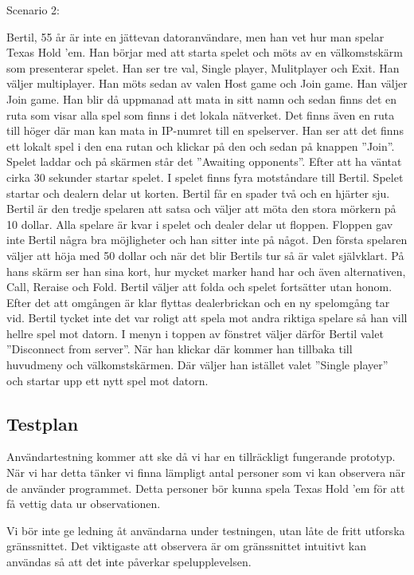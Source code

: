 \documentclass[10pt,twoside,a4paper]{article}
\begin{document}
\vspace{1em}
\noindent
Scenario 2:

\vspace{1em}
\noindent
Bertil, 55 år är inte en jättevan datoranvändare, men han vet hur man
spelar Texas Hold ’em. Han börjar med att starta spelet och möts av en
välkomstskärm som presenterar spelet. Han ser tre val, Single player,
Mulitplayer och Exit. Han väljer multiplayer. Han möts sedan av valen Host
game och Join game. Han väljer Join game. Han blir då uppmanad att mata in
sitt namn och sedan finns det en ruta som visar alla spel som finns i det
lokala nätverket. Det finns även en ruta till höger där man kan mata in
IP-numret till en spelserver. Han ser att det finns ett lokalt spel i den
ena rutan och klickar på den och sedan på knappen ”Join”. Spelet laddar och
på skärmen står det ”Awaiting opponents”. Efter att ha väntat cirka 30
sekunder startar spelet. I spelet finns fyra motståndare till Bertil.
Spelet startar och dealern delar ut korten. Bertil får en spader två och en
hjärter sju. Bertil är den tredje spelaren att satsa och väljer att möta
den stora mörkern på 10 dollar. Alla spelare är kvar i spelet och dealer
delar ut floppen. Floppen gav inte Bertil några bra möjligheter och han
sitter inte på något. Den första spelaren väljer att höja med 50 dollar och
när det blir Bertils tur så är valet självklart. På hans skärm ser han sina
kort, hur mycket marker hand har och även alternativen, Call, Reraise och
Fold. Bertil väljer att folda och spelet fortsätter utan honom. Efter det
att omgången är klar flyttas dealerbrickan och en ny spelomgång tar vid.
Bertil tycket inte det var roligt att spela mot andra riktiga spelare så
han vill hellre spel mot datorn. I menyn i toppen av fönstret väljer därför
Bertil valet ”Disconnect from server”. När han klickar där kommer han
tillbaka till huvudmeny och välkomstskärmen. Där väljer han istället valet
”Single player” och startar upp ett nytt spel mot datorn.

\subsection*{Testplan}

Användartestning kommer att ske då vi har en tillräckligt fungerande
prototyp. När vi har detta tänker vi finna lämpligt antal personer som vi
kan observera när de använder programmet. Detta personer bör kunna spela
Texas Hold 'em för att få vettig data ur observationen.

Vi bör inte ge ledning åt användarna under testningen, utan låte de fritt
utforska gränssnittet. Det viktigaste att observera är om gränssnittet
intuitivt kan användas så att det inte påverkar spelupplevelsen.
\end{document}
